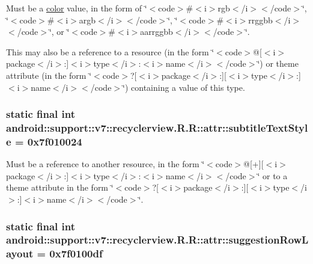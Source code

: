 Must be a \hyperlink{classandroid_1_1support_1_1v7_1_1recyclerview_1_1_r_1_1color}{color} value, in the form of \char`\"{}$<$code$>$\#$<$i$>$rgb$<$/i$>$$<$/code$>$\char`\"{}, \char`\"{}$<$code$>$\#$<$i$>$argb$<$/i$>$$<$/code$>$\char`\"{}, \char`\"{}$<$code$>$\#$<$i$>$rrggbb$<$/i$>$$<$/code$>$\char`\"{}, or \char`\"{}$<$code$>$\#$<$i$>$aarrggbb$<$/i$>$$<$/code$>$\char`\"{}. 

This may also be a reference to a resource (in the form \char`\"{}$<$code$>$@\mbox{[}$<$i$>$package$<$/i$>$:\mbox{]}$<$i$>$type$<$/i$>$:$<$i$>$name$<$/i$>$$<$/code$>$\char`\"{}) or theme attribute (in the form \char`\"{}$<$code$>$?\mbox{[}$<$i$>$package$<$/i$>$:\mbox{]}\mbox{[}$<$i$>$type$<$/i$>$:\mbox{]}$<$i$>$name$<$/i$>$$<$/code$>$\char`\"{}) containing a value of this type. \hypertarget{classandroid_1_1support_1_1v7_1_1recyclerview_1_1_r_1_1attr_6fee3464a68c7bde3dc0e6f6346450fe}{
\subsubsection[{subtitleTextStyle}]{\setlength{\rightskip}{0pt plus 5cm}static final int android::support::v7::recyclerview.R.R::attr::subtitleTextStyle = 0x7f010024}}
\label{classandroid_1_1support_1_1v7_1_1recyclerview_1_1_r_1_1attr_6fee3464a68c7bde3dc0e6f6346450fe}


Must be a reference to another resource, in the form \char`\"{}$<$code$>$@\mbox{[}+\mbox{]}\mbox{[}$<$i$>$package$<$/i$>$:\mbox{]}$<$i$>$type$<$/i$>$:$<$i$>$name$<$/i$>$$<$/code$>$\char`\"{} or to a theme attribute in the form \char`\"{}$<$code$>$?\mbox{[}$<$i$>$package$<$/i$>$:\mbox{]}\mbox{[}$<$i$>$type$<$/i$>$:\mbox{]}$<$i$>$name$<$/i$>$$<$/code$>$\char`\"{}. \hypertarget{classandroid_1_1support_1_1v7_1_1recyclerview_1_1_r_1_1attr_b9f8348d0b2f834bd8ec7c461fc0bc37}{
\subsubsection[{suggestionRowLayout}]{\setlength{\rightskip}{0pt plus 5cm}static final int android::support::v7::recyclerview.R.R::attr::suggestionRowLayout = 0x7f0100df}}
\label{classandroid_1_1support_1_1v7_1_1recyclerview_1_1_r_1_1attr_b9f8348d0b2f834bd8ec7c461fc0bc37}


